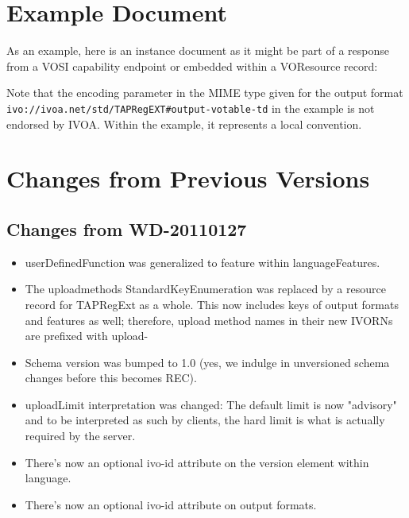 \documentclass{ivoa}
\begin{document}
\label{fullschem}



\section{Example Document}

\label{appB}

As an example, here is an instance document as it might be 
part of a response from a VOSI capability endpoint or embedded 
within a VOResource record:

Note that the encoding parameter in the MIME type given for the output format
\nolinkurl{ivo://ivoa.net/std/TAPRegEXT\#output-votable-td} in the example is not
endorsed by IVOA.  Within the example, it represents a local convention.




\section{Changes from Previous Versions}

\label{changes}


\subsection{Changes from WD-20110127}

\label{changes-20110127}

\begin{itemize}

\item userDefinedFunction was generalized to feature within languageFeatures.{}

\item The uploadmethods StandardKeyEnumeration was replaced by a
resource record for TAPRegExt as a whole.  This now includes keys of output
formats and features as well; therefore, upload method names in their new
IVORNs are prefixed with upload-{}

\item Schema version was bumped to 1.0 (yes, we indulge in unversioned
schema changes before this becomes REC).{}

\item uploadLimit interpretation was changed: The default limit is now
"advisory" and to be interpreted as such by clients, the hard limit
is what is actually required by the server.{}

\item There's now an optional ivo-id attribute on the version element
within language.{}

\item There's now an optional ivo-id attribute on output formats.{}

\end{itemize}
\end{document}
